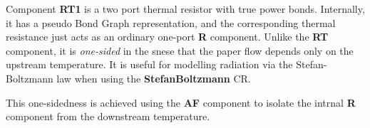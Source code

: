 Component \textbf{RT1} is a two port thermal resistor with true power
bonds. Internally, it has a pseudo Bond Graph representation, and the
corresponding thermal resistance just acts as an ordinary one-port
\textbf{R} component.
Unlike the {\bf RT} component, it is {\em one-sided\/} in the snese
that the paper flow depends only on the upstream temperature. It is
useful for modelling radiation via the Stefan-Boltzmann law when using
the {\bf StefanBoltzmann} CR.


This one-sidedness is achieved using the {\bf AF} component to isolate
the intrnal {\bf R} component from the downstream temperature.
 

